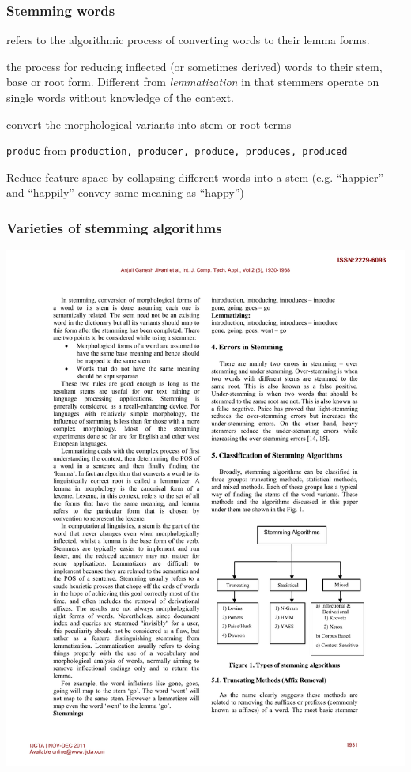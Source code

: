 \documentclass[11pt,handout]{beamer}
\begin{document}
\begin{frame}
  \frametitle{Stemming words}
  \begin{description}[<+->]
  \item[Lemmatization] refers to the algorithmic process of
    converting words to their lemma forms.  \pause
  \item[stemming] the
    process for reducing inflected (or sometimes derived) words to
    their stem, base or root form.  Different from
    \emph{lemmatization} in that stemmers operate on single words
    without knowledge of the context.
   \item[both] convert the morphological variants into stem or root terms
  \item[example:]
    \alert{\texttt{produc}} from \newline
    \texttt{production, producer, produce, produces, produced}
  \item[Why?] Reduce feature space by collapsing different words into a stem (e.g. ``happier'' and ``happily'' convey same meaning as ``happy'')
  \end{description}
\end{frame}

\begin{frame}
  \frametitle{Varieties of stemming algorithms}
  \begin{center}
    \includegraphics{stemming_algorithms.pdf}
  \end{center}
\end{frame}
\end{document}
